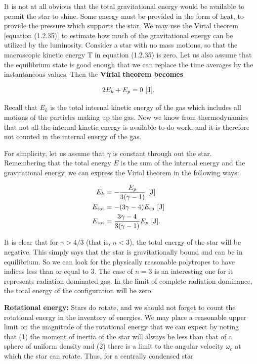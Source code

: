 \documentclass[a4paper,10pt]{article}
\begin{document}
{\noindent}It is not at all obvious that the total gravitational energy would be available to permit the star to shine. Some energy must be provided in the form of heat, to provide the pressure which supports the star. We may use the Virial theorem [equation (1.2.35)] to estimate how much of the gravitational energy can be utilized by the luminosity. Consider a star with no mass motions, so that the macroscopic kinetic energy T in equation (1.2.35) is zero. Let us also assume that the equilibrium state is good enough that we can replace the time averages by the instantaneous values. Then the \textbf{Virial theorem becomes}

\begin{align*}
    2E_k+E_p = 0 ~ [{\rm J}].
\end{align*}

{\noindent}Recall that $E_k$ is the total internal kinetic energy of the gas which includes all motions of the particles making up the gas. Now we know from thermodynamics that not all the internal kinetic energy is available to do work, and it is therefore not counted in the internal energy of the gas.

{\noindent}For simplicity, let us assume that $\gamma$ is constant through out the star. Remembering that the total energy $E$ is the sum of the internal energy and the gravitational energy, we can express the Virial theorem in the following ways:

\begin{align*}
    E_k &= -\frac{E_p}{3(\gamma-1)} ~ [{\rm J}]\\
    E_{\rm tot} &= -(3\gamma-4)E_{\rm th} ~ [{\rm J}]\\
    E_{\rm tot} &= \frac{3\gamma-4}{3(\gamma-1)}E_p ~ [{\rm J}].
\end{align*}

{\noindent}It is clear that for $\gamma>4/3$ (that is, $n<3$), the total energy of the star will be negative. This simply says that the star is gravitationally bound and can be in equilibrium. So we can look for the physically reasonable polytropes to have indices less than or equal to $3$. The case of $n=3$ is an interesting one for it represents radiation dominated gas. In the limit of complete radiation dominance, the total energy of the configuration will be zero.

{\noindent}\textbf{Rotational energy:} Stars do rotate, and we should not forget to count the rotational energy in the inventory of energies. We may place a reasonable upper limit on the magnitude of the rotational energy that we can expect by noting that (1) the moment of inertia of the star will always be less than that of a sphere of uniform density and (2) there is a limit to the angular velocity $\omega_c$ at which the star can rotate. Thus, for a centrally condensed star
\end{document}
